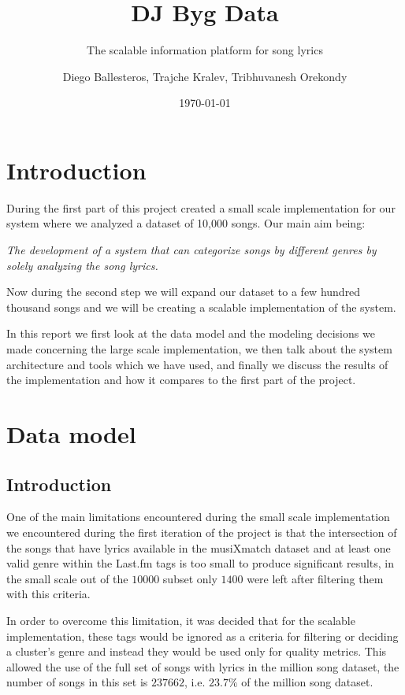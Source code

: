 \documentclass[10pt,a4paper]{scrartcl}
\author{Diego Ballesteros, Trajche Kralev, Tribhuvanesh Orekondy}
\title{DJ Byg Data}
\subtitle{The scalable information platform for song lyrics}
\date{\today}
\begin{document}
  \maketitle
  \section{Introduction}

	  During the first part of this project created a small scale implementation
	  for our system where we analyzed a dataset of 10,000 songs. Our main aim
	  being:
	  
	  \emph{The development of a system that can categorize songs by different
	  genres by solely analyzing the song lyrics.}
	
	  Now during the second step we will expand our dataset to a few hundred thousand
	  songs and we will be creating a scalable implementation of the system.

		In this report we first look at the data model and the modeling decisions
		we made concerning the large scale implementation, we then talk about the
   	system architecture and tools which we have used, and finally we discuss the
   	results of the implementation and how it compares to the first part of the
   	project.

  \section{Data model}
    \subsection{Introduction}

    One of the main limitations encountered during the small scale implementation
    we encountered during the first iteration of the project is that the
    intersection of the songs that have lyrics available in the musiXmatch
    dataset and at least one valid genre within the Last.fm tags is too small to
    produce significant results, in the small scale out of the $10000$ subset only
    $1400$ were left after filtering them with this criteria.
    
    In order to overcome this limitation, it was decided that for the scalable
    implementation, these tags would be ignored as a criteria for filtering or
    deciding a cluster's genre and instead they would be used only for quality
    metrics. This allowed the use of the full set of songs with lyrics in the
    million song dataset, the number of songs in this set is $237662$, i.e. 
    $23.7\%$ of the million song dataset.
    
\end{document}
